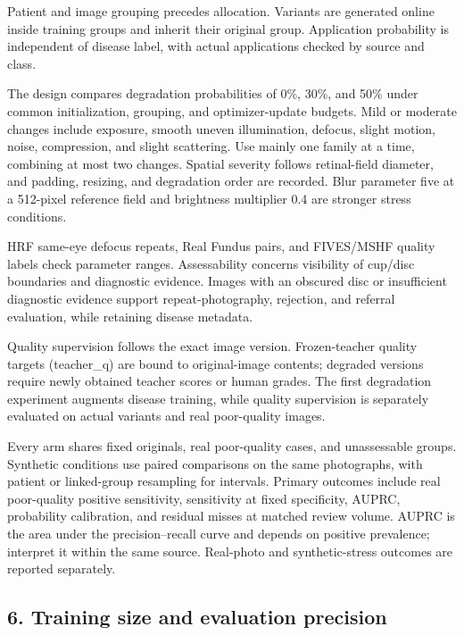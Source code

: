 \documentclass[
  10pt,
]{article}
\begin{document}
Patient and image grouping precedes allocation. Variants are generated
online inside training groups and inherit their original group.
Application probability is independent of disease label, with actual
applications checked by source and class.

The design compares degradation probabilities of 0\%, 30\%, and 50\%
under common initialization, grouping, and optimizer-update budgets.
Mild or moderate changes include exposure, smooth uneven illumination,
defocus, slight motion, noise, compression, and slight scattering. Use
mainly one family at a time, combining at most two changes. Spatial
severity follows retinal-field diameter, and padding, resizing, and
degradation order are recorded. Blur parameter five at a 512-pixel
reference field and brightness multiplier 0.4 are stronger stress
conditions.

HRF same-eye defocus repeats, Real Fundus pairs, and FIVES/MSHF quality
labels check parameter ranges. Assessability concerns visibility of
cup/disc boundaries and diagnostic evidence. Images with an obscured
disc or insufficient diagnostic evidence support repeat-photography,
rejection, and referral evaluation, while retaining disease metadata.

Quality supervision follows the exact image version. Frozen-teacher
quality targets (teacher\_q) are bound to original-image contents;
degraded versions require newly obtained teacher scores or human grades.
The first degradation experiment augments disease training, while
quality supervision is separately evaluated on actual variants and real
poor-quality images.

Every arm shares fixed originals, real poor-quality cases, and
unassessable groups. Synthetic conditions use paired comparisons on the
same photographs, with patient or linked-group resampling for intervals.
Primary outcomes include real poor-quality positive sensitivity,
sensitivity at fixed specificity, AUPRC, probability calibration, and
residual misses at matched review volume. AUPRC is the area under the
precision--recall curve and depends on positive prevalence; interpret it
within the same source. Real-photo and synthetic-stress outcomes are
reported separately.

\subsection{6. Training size and evaluation
precision}\label{training-size-and-evaluation-precision}
\end{document}
